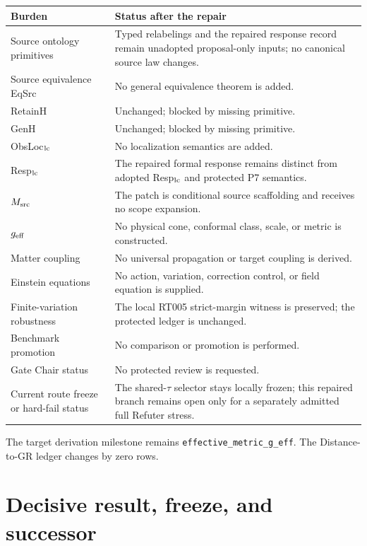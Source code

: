 \documentclass[11pt]{article}
\begin{document}
\begin{longtable}{>{\raggedright\arraybackslash}p{}>{\raggedright\arraybackslash}p{}}
\toprule
Burden & Status after the repair \\
\midrule
Source ontology primitives & Typed relabelings and the repaired response record remain unadopted proposal-only inputs; no canonical source law changes. \\
Source equivalence EqSrc & No general equivalence theorem is added. \\
RetainH & Unchanged; blocked by missing primitive. \\
GenH & Unchanged; blocked by missing primitive. \\
ObsLoc$_{\rm lc}$ & No localization semantics are added. \\
Resp$_{\rm lc}$ & The repaired formal response remains distinct from adopted Resp$_{\rm lc}$ and protected P7 semantics. \\
$M_{\rm src}$ & The patch is conditional source scaffolding and receives no scope expansion. \\
$g_{\rm eff}$ & No physical cone, conformal class, scale, or metric is constructed. \\
Matter coupling & No universal propagation or target coupling is derived. \\
Einstein equations & No action, variation, correction control, or field equation is supplied. \\
Finite-variation robustness & The local RT005 strict-margin witness is preserved; the protected ledger is unchanged. \\
Benchmark promotion & No comparison or promotion is performed. \\
Gate Chair status & No protected review is requested. \\
Current route freeze or hard-fail status & The shared-$\tau$ selector stays locally frozen; this repaired branch remains open only for a separately admitted full Refuter stress. \\
\bottomrule
\end{longtable}

The target derivation milestone remains \texttt{effective\_metric\_g\_eff}.
The Distance-to-GR ledger changes by zero rows.

\section{Decisive result, freeze, and successor}
\end{document}
